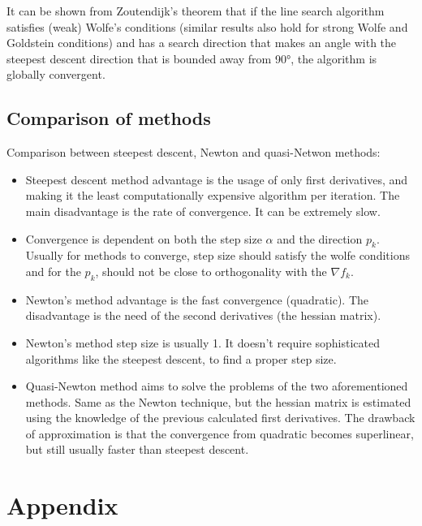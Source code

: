 \documentclass[a4paper,11pt]{article}
\numberwithin{equation}{section} %
\begin{document}
It can be shown from Zoutendijk's theorem that if the line search algorithm satisfies (weak) Wolfe's conditions (similar results also hold for strong Wolfe and Goldstein conditions) and has a search direction that makes an angle with the steepest descent direction that is bounded away from 90°, the algorithm is globally convergent. 

\subsection{Comparison of methods}

Comparison between steepest descent, Newton and quasi-Netwon methods:

\begin{itemize}
    \item Steepest descent method advantage is the usage of only first derivatives, and making it the least computationally expensive algorithm per iteration. The main disadvantage is the rate of convergence. It can be extremely slow.

    \item Convergence is dependent on both the step size $\alpha$ and the direction $p_k$. Usually for methods to converge, step size should satisfy the wolfe conditions and for the $p_k$, should not be close to orthogonality with the $\nabla f_k$.
    
    \item Newton's method advantage is the fast convergence (quadratic). The disadvantage is the need of the second derivatives (the hessian matrix). 
    
    \item Newton's method step size is usually 1. It doesn't require sophisticated algorithms like the steepest descent, to find a proper step size.
    
    \item Quasi-Newton method aims to solve the problems of the two aforementioned methods. Same as the Newton technique, but the hessian matrix is estimated using the knowledge of the previous calculated first derivatives. The drawback of approximation is that the convergence from quadratic becomes superlinear, but still usually faster than steepest descent.
    
\end{itemize}

\label{appendix}
\section{Appendix}






\end{document}
